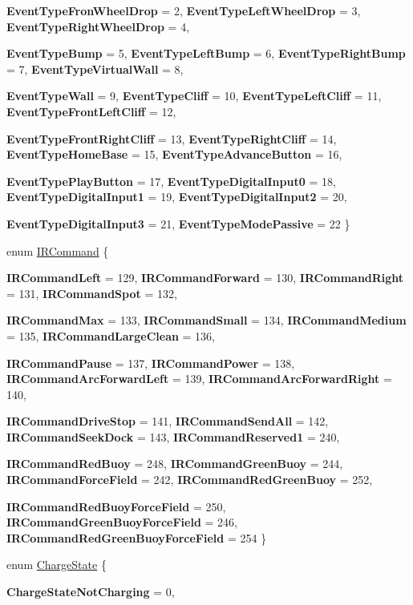 \begin{DoxyCompactItemize}
{\bfseries EventTypeFronWheelDrop} =  2, 
{\bfseries EventTypeLeftWheelDrop} =  3, 
{\bfseries EventTypeRightWheelDrop} =  4, 
\par
{\bfseries EventTypeBump} =  5, 
{\bfseries EventTypeLeftBump} =  6, 
{\bfseries EventTypeRightBump} =  7, 
{\bfseries EventTypeVirtualWall} =  8, 
\par
{\bfseries EventTypeWall} =  9, 
{\bfseries EventTypeCliff} =  10, 
{\bfseries EventTypeLeftCliff} =  11, 
{\bfseries EventTypeFrontLeftCliff} =  12, 
\par
{\bfseries EventTypeFrontRightCliff} =  13, 
{\bfseries EventTypeRightCliff} =  14, 
{\bfseries EventTypeHomeBase} =  15, 
{\bfseries EventTypeAdvanceButton} =  16, 
\par
{\bfseries EventTypePlayButton} =  17, 
{\bfseries EventTypeDigitalInput0} =  18, 
{\bfseries EventTypeDigitalInput1} =  19, 
{\bfseries EventTypeDigitalInput2} =  20, 
\par
{\bfseries EventTypeDigitalInput3} =  21, 
{\bfseries EventTypeModePassive} =  22
 \}
\item 
enum \hyperlink{class_arduino_roomba_a71fa7df913e00d7c92298f8802f9667c}{IRCommand} \{ \par
{\bfseries IRCommandLeft} =  129, 
{\bfseries IRCommandForward} =  130, 
{\bfseries IRCommandRight} =  131, 
{\bfseries IRCommandSpot} =  132, 
\par
{\bfseries IRCommandMax} =  133, 
{\bfseries IRCommandSmall} =  134, 
{\bfseries IRCommandMedium} =  135, 
{\bfseries IRCommandLargeClean} =  136, 
\par
{\bfseries IRCommandPause} =  137, 
{\bfseries IRCommandPower} =  138, 
{\bfseries IRCommandArcForwardLeft} =  139, 
{\bfseries IRCommandArcForwardRight} =  140, 
\par
{\bfseries IRCommandDriveStop} =  141, 
{\bfseries IRCommandSendAll} =  142, 
{\bfseries IRCommandSeekDock} =  143, 
{\bfseries IRCommandReserved1} =  240, 
\par
{\bfseries IRCommandRedBuoy} =  248, 
{\bfseries IRCommandGreenBuoy} =  244, 
{\bfseries IRCommandForceField} =  242, 
{\bfseries IRCommandRedGreenBuoy} =  252, 
\par
{\bfseries IRCommandRedBuoyForceField} =  250, 
{\bfseries IRCommandGreenBuoyForceField} =  246, 
{\bfseries IRCommandRedGreenBuoyForceField} =  254
 \}
\item 
enum \hyperlink{class_arduino_roomba_a25509a441bf3c60281aebab8797620ef}{ChargeState} \{ \par
{\bfseries ChargeStateNotCharging} =  0, 

\end{DoxyCompactItemize}
